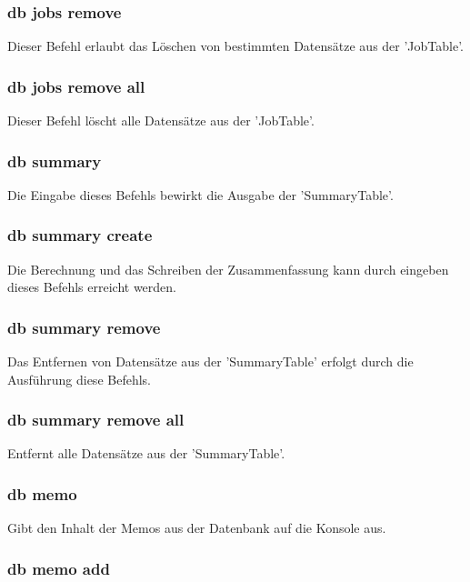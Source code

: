 \documentclass[12pt,a4paper]{report}
\begin{document}
\begin{onehalfspace}
\subsubsection{db jobs remove}

Dieser Befehl erlaubt das Löschen von bestimmten Datensätze aus der 'JobTable'.

\subsubsection{db jobs remove all}

Dieser Befehl löscht alle Datensätze aus der 'JobTable'.

\subsubsection{db summary}

Die Eingabe dieses Befehls bewirkt die Ausgabe der 'SummaryTable'.

\subsubsection{db summary create}

Die Berechnung und das Schreiben der Zusammenfassung kann durch eingeben dieses Befehls erreicht werden.

\subsubsection{db summary remove}

Das Entfernen von Datensätze aus der 'SummaryTable' erfolgt durch die Ausführung diese Befehls.

\subsubsection{db summary remove all}

Entfernt alle Datensätze aus der 'SummaryTable'.

\subsubsection{db memo}

Gibt den Inhalt der Memos aus der Datenbank auf die Konsole aus.

\subsubsection{db memo add}


\end{onehalfspace}
\end{document}
